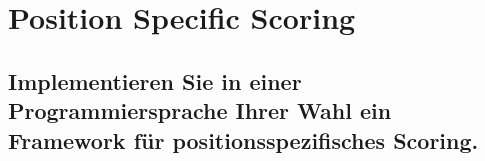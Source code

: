 \section{Position Specific Scoring}
\subsection*{Implementieren Sie in einer Programmiersprache Ihrer Wahl ein Framework für positionsspezifisches Scoring.}






